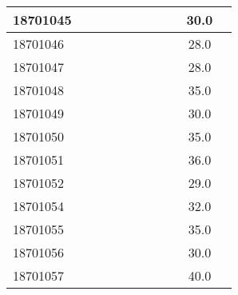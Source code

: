 \documentclass[12pt]{article}
\begin{document}
\begin{center}
\begin{small}
\begin{tabular}{|l|c|c|c|c|c|c|c|c|c|c|}
18701045 &  &  &  &  &  &  &  &  & 30.0\\ \hline 
18701046 &  &  &  &  &  &  &  &  & 28.0\\ \hline 
18701047 &  &  &  &  &  &  &  &  & 28.0\\ \hline 
18701048 &  &  &  &  &  &  &  &  & 35.0\\ \hline 
18701049 &  &  &  &  &  &  &  &  & 30.0\\ \hline 
18701050 &  &  &  &  &  &  &  &  & 35.0\\ \hline 
18701051 &  &  &  &  &  &  &  &  & 36.0\\ \hline 
18701052 &  &  &  &  &  &  &  &  & 29.0\\ \hline 
18701054 &  &  &  &  &  &  &  &  & 32.0\\ \hline 
18701055 &  &  &  &  &  &  &  &  & 35.0\\ \hline 
18701056 &  &  &  &  &  &  &  &  & 30.0\\ \hline 
18701057 &  &  &  &  &  &  &  &  & 40.0\\ \hline 
        \end{tabular}
            \end{small}
            \end{center}
  \centering
            
\end{document}

